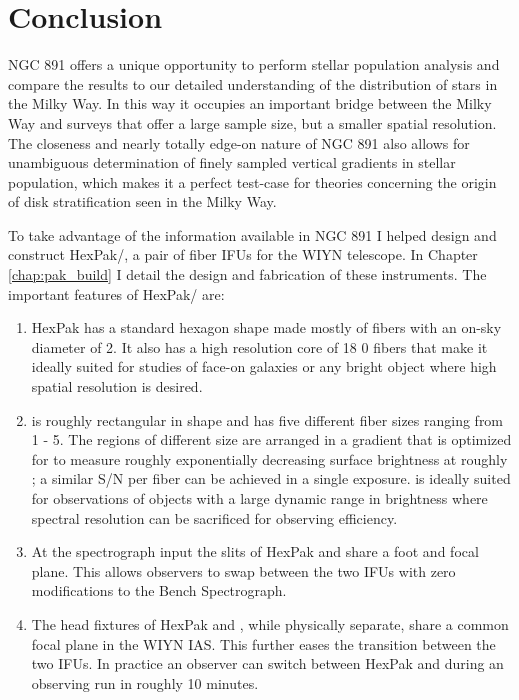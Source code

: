 \chapter[Conclusion]{Conclusion}
\label{chap:conclusion}


\clearpage
NGC 891 offers a unique opportunity to perform stellar population
analysis and compare the results to our detailed understanding of the
distribution of stars in the Milky Way. In this way it occupies an
important bridge between the Milky Way and surveys that offer a large
sample size, but a smaller spatial resolution. The closeness and
nearly totally edge-on nature of NGC 891 also allows for unambiguous
determination of finely sampled vertical gradients in stellar
population, which makes it a perfect test-case for theories concerning
the origin of disk stratification seen in the Milky Way.

To take advantage of the information available in NGC 891 I helped
design and construct HexPak/\GP, a pair of fiber IFUs for the WIYN
telescope. In Chapter \ref{chap:pak_build} I detail the design and
fabrication of these instruments. The important features of HexPak/\GP
are:
\begin{enumerate}
\item HexPak has a standard hexagon shape made mostly of fibers with
  an on-sky diameter of 2. It also has a high resolution core
  of 18 0 fibers that make it ideally suited for studies of
  face-on galaxies or any bright object where high spatial resolution
  is desired.

\item \GP is roughly rectangular in shape and has five different fiber
  sizes ranging from 1 - 5. The regions of different
  size are arranged in a gradient that is optimized for to measure
  roughly exponentially decreasing surface brightness at roughly
  ; a similar S/N per fiber can be achieved in a single
  exposure. \GP is ideally suited for observations of objects with a
  large dynamic range in brightness where spectral resolution can be
  sacrificed for observing efficiency.

\item At the spectrograph input the slits of HexPak and \GP share a
  foot and focal plane. This allows observers to swap between the two
  IFUs with zero modifications to the Bench Spectrograph.

\item The head fixtures of HexPak and \GP, while physically separate,
  share a common focal plane in the WIYN IAS. This further eases the
  transition between the two IFUs. In practice an observer can switch
  between HexPak and \GP during an observing run in roughly 10
  minutes.

\end{enumerate}

